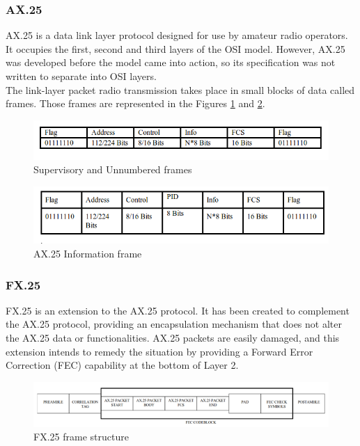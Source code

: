 \pagebreak

\subsubsection{AX.25}
AX.25 is a data link layer protocol designed for use by amateur radio operators. It occupies the first, second and third layers of the OSI model. However, AX.25 was developed before the model came into action, so its specification was not written to separate into OSI layers.\\

The link-layer packet radio transmission takes place in small blocks of data called frames. Those frames are represented in the Figures \ref{f2.7} and \ref{f2.8}.\\

 \begin{figure}[H]
\centerline{\includegraphics[width=1\textwidth]{images/ax25a.png}}
\caption{Supervisory and Unnumbered frames \cite{AX25}}
\label{f2.7}
\end{figure}

\begin{figure}[H]
\centerline{\includegraphics[width=1\textwidth]{images/ax25b.png}}
\caption{AX.25 Information frame \cite{AX25}}
\label{f2.8}
\end{figure}

\subsubsection{FX.25}
FX.25 is an extension to the AX.25 protocol. It has been created to complement the AX.25 protocol, providing an encapsulation mechanism that does not alter the AX.25 data or functionalities. AX.25 packets are easily damaged, and this extension intends to remedy the situation by providing a Forward Error Correction (FEC) capability at the bottom of Layer 2.

\begin{figure}[H]
\centerline{\includegraphics[width=1\textwidth]{images/fx25.png}}
\caption{FX.25 frame structure \cite{FX25}}
\label{f3.5}
\end{figure}

\newpage

\newpage
